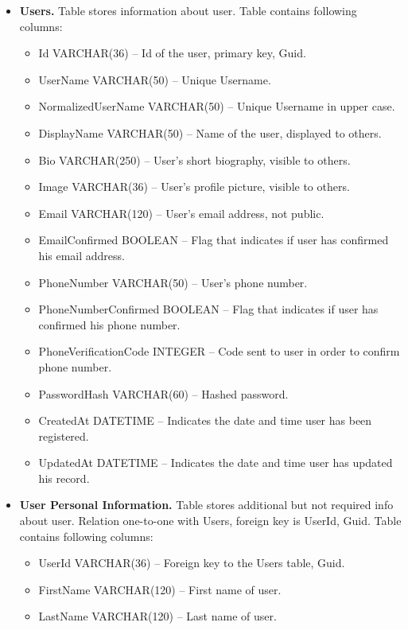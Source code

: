 \begin{itemize}
    \item \textbf{Users.} Table stores information about user.
    Table contains following columns:
    \begin{itemize}
        \item Id VARCHAR(36) -- Id of the user, primary key, Guid.
        \item UserName VARCHAR(50) -- Unique Username.
        \item NormalizedUserName VARCHAR(50) -- Unique Username in upper case.
        \item DisplayName VARCHAR(50) -- Name of the user, displayed to others.
        \item Bio VARCHAR(250) -- User's short biography, visible to others.
        \item Image VARCHAR(36) -- User's profile picture, visible to others.
        \item Email VARCHAR(120) -- User's email address, not public.
        \item EmailConfirmed BOOLEAN -- Flag that indicates if user has confirmed his email address.
        \item PhoneNumber VARCHAR(50) -- User's phone number.
        \item PhoneNumberConfirmed BOOLEAN -- Flag that indicates if user has confirmed his phone number.
        \item PhoneVerificationCode INTEGER -- Code sent to user in order to confirm phone number.
        \item PasswordHash VARCHAR(60) -- Hashed password.
        \item CreatedAt DATETIME -- Indicates the date and time user has been registered.
        \item UpdatedAt DATETIME -- Indicates the date and time user has updated his record.
    \end{itemize}
    \item \textbf{User Personal Information.} Table stores additional but not required info about user.
    Relation one-to-one with Users, foreign key is UserId, Guid.
    Table contains following columns:
    \begin{itemize}
        \item UserId VARCHAR(36) -- Foreign key to the Users table, Guid.
        \item FirstName VARCHAR(120) -- First name of user.
        \item LastName VARCHAR(120) -- Last name of user.

\end{itemize}
\end{itemize}
